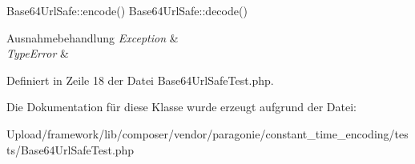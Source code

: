 Base64\+Url\+Safe\+::encode()  Base64\+Url\+Safe\+::decode()


\begin{DoxyExceptions}{Ausnahmebehandlung}
{\em Exception} & \\
\hline
{\em Type\+Error} & \\
\hline
\end{DoxyExceptions}


Definiert in Zeile 18 der Datei Base64\+Url\+Safe\+Test.\+php.



Die Dokumentation für diese Klasse wurde erzeugt aufgrund der Datei\+:\begin{DoxyCompactItemize}
\item 
Upload/framework/lib/composer/vendor/paragonie/constant\+\_\+time\+\_\+encoding/tests/Base64\+Url\+Safe\+Test.\+php\end{DoxyCompactItemize}
